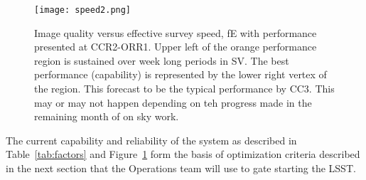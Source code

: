 \begin{figure}[t]
  \centering
\texttt{[image: speed2.png]}
\caption{Image quality versus effective survey speed, fE with performance presented at CCR2-ORR1. Upper left of the orange performance region is sustained over week long periods in SV. The best performance (capability) is represented by the lower right vertex of the region. This forecast to be the typical performance by CC3. This may or may not happen depending on teh progress made in the remaining month of on sky work. }
\label{speed2}
\end{figure}

The current capability and reliability of the system as described in Table~\ref{tab:factors} and Figure~\ref{speed2} form the basis of optimization criteria described in the next section that the Operations team will use to gate starting the LSST. 

\newpage


